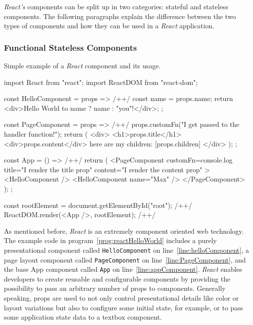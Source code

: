 \emph{React's} components can be split up in two categories: stateful and stateless components. The following paragraphs explain the difference between the two types of components and how they can be used in a \emph{React} application.

\subsubsection{Functional Stateless Components}

\begin{program}
\caption{Simple example of a \emph{React} component and its usage.} 
\label{prog:reactHelloWorld}
\begin{JsCode}
import React from "react";
import ReactDOM from "react-dom";

const HelloComponent = props => { /+\label{line:helloComponent}+/
  const name = props.name;
  return <div>Hello World to {name ? name : "you"}!</div>;
};

const PageComponent = props => { /+\label{line:PageComponent}+/
  props.customFn("I get passed to the handler function!");
  return (
    <div>
      <h1>{props.title}</h1>
      <div>{props.content}</div>
      here are my children: [{props.children}]
    </div>
  );
};

const App = () => { /+\label{line:appComponent}+/
  return (
    <PageComponent
      customFn={console.log}
      title="I render the title prop"
      content="I render the content prop"
    >
      <HelloComponent />
      <HelloComponent name={"Max"} />
    </PageComponent>
  );
};

const rootElement = document.getElementById("root"); /+\label{line:reactRoot}+/
ReactDOM.render(<App />, rootElement); /+\label{line:reactDomRender}+/
\end{JsCode}
\end{program}

As mentioned before, \emph{React} is an extremely component oriented web technology. The example code in program~\ref{prog:reactHelloWorld} includes a purely presentational component called \texttt{Hello\-Component} on line~\ref{line:helloComponent}, a page layout component called \texttt{PageComponent} on line~\ref{line:PageComponent}, and the base App component called \texttt{App} on line~\ref{line:appComponent}. \emph{React} enables developers to create reusable and configurable components by providing the possibility to pass an arbitrary number of props to components. Generally speaking, props are used to not only control presentational details like color or layout variations but also to configure some initial state, for example, or to pass some application state data to a textbox component.

